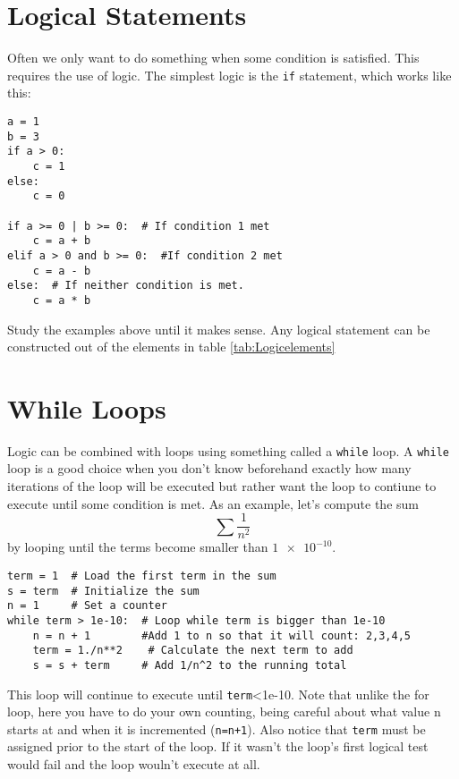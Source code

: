 \section{Logical Statements}
 Often we only want to do something when some condition is satisfied.
This requires the use of logic.  The simplest logic is the \texttt{if}
statement, which works like this:
\begin{Verbatim}
a = 1
b = 3
if a > 0:
    c = 1
else:
    c = 0

if a >= 0 | b >= 0:  # If condition 1 met
    c = a + b
elif a > 0 and b >= 0:  #If condition 2 met
    c = a - b
else:  # If neither condition is met.
    c = a * b
\end{Verbatim}
Study the examples above until it makes sense.  Any logical statement
can be constructed out of the elements in table
\ref{tab:Logicelements}

\section{While Loops}
Logic can be combined with loops using something called a
\texttt{while} loop.  A \texttt{while} loop is a good choice when you
don't know beforehand exactly how many iterations of the loop will be
executed but rather want the loop to contiune to execute until some
condition is met.  As an example, let's compute the sum 
\begin{equation}
\sum \frac{1}{n^2}
\end{equation}
by looping until the terms become smaller than $\num{1e-10}$.
\begin{Verbatim}
term = 1  # Load the first term in the sum
s = term  # Initialize the sum 
n = 1     # Set a counter
while term > 1e-10:  # Loop while term is bigger than 1e-10
    n = n + 1        #Add 1 to n so that it will count: 2,3,4,5
    term = 1./n**2    # Calculate the next term to add
    s = s + term     # Add 1/n^2 to the running total
\end{Verbatim} 
This loop will continue to execute until \texttt{term}<1e-10. Note
that unlike the for loop, here you have to do your own counting, being
careful about what value n starts at and when it is incremented
(\texttt{n=n+1}). Also notice that \texttt{term} must be assigned
prior to the start of the loop.  If it wasn't the loop's first logical
test would fail and the loop wouln't execute at all.

